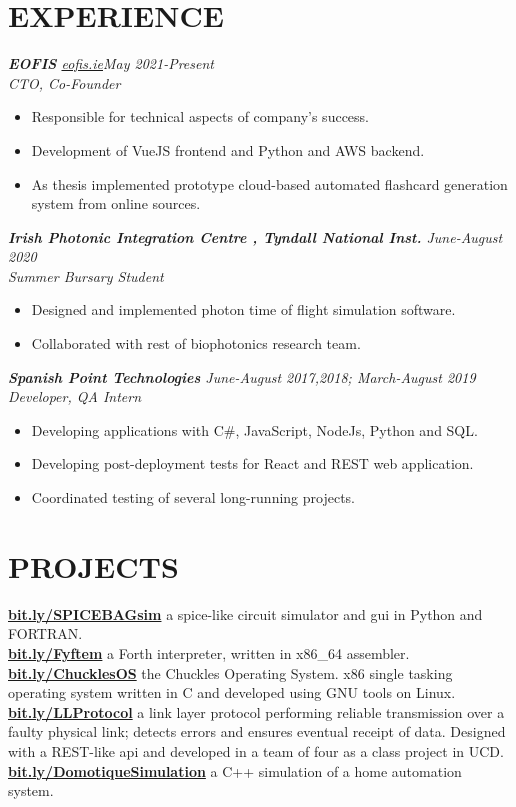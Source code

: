 \documentclass[sectionsleft,centered,10pt]{res}
\let\oldhref\href
\renewcommand{\href}[2]{\oldhref{#1}{\textbf{#2}}}
\begin{document}
\begin{resume}
\section{EXPERIENCE}
{\sl\textbf{EOFIS} \hspace{0.5cm}\oldhref{https://eofis.ie}{eofis.ie}\hfill May 2021-Present}\\
\emph{CTO, Co-Founder}
\begin{itemize}
	\item Responsible for technical aspects of company's success.
	\item Development of VueJS frontend and Python and AWS backend.
	\item As thesis implemented prototype cloud-based automated flashcard generation system from online sources.
\end{itemize}
{\sl\textbf{Irish Photonic Integration Centre , Tyndall National Inst.} \hfill June-August 2020}\\
\emph{Summer Bursary Student}
\begin{itemize}
	\item Designed and implemented photon time of flight simulation software.
	\item Collaborated with rest of biophotonics research team.
\end{itemize}
{\sl\textbf{Spanish Point Technologies} \hfill June-August 2017,2018; March-August 2019}\\
\emph{Developer, QA Intern}
\begin{itemize}
	\item Developing applications with C\#, JavaScript, NodeJs, Python and SQL.
	\item Developing post-deployment tests for React and REST web application.
	\item Coordinated testing of several long-running projects.
\end{itemize}

\section{PROJECTS}
\href{http://bit.ly/SPICEBAGsim}{bit.ly/SPICEBAGsim} a spice-like circuit simulator and gui in Python and FORTRAN.\\
\href{http://bit.ly/Fyftem}{bit.ly/Fyftem} a Forth interpreter, written in x86\_64 assembler.\\
\href{http://bit.ly/ChucklesOS}{bit.ly/ChucklesOS} the Chuckles Operating System. x86 single tasking operating system written in C and developed using GNU tools on Linux.\\
\href{http://bit.ly/LLProtocol}{bit.ly/LLProtocol} a link layer protocol performing reliable transmission over a faulty physical link; detects errors and ensures eventual receipt of data. Designed with a REST-like api and developed in a team of four as a class project in UCD.\\
\href{http://bit.ly/DomotiqueSimulation}{bit.ly/DomotiqueSimulation} a C++ simulation of a home automation system.\\


\end{resume}
\end{document}
